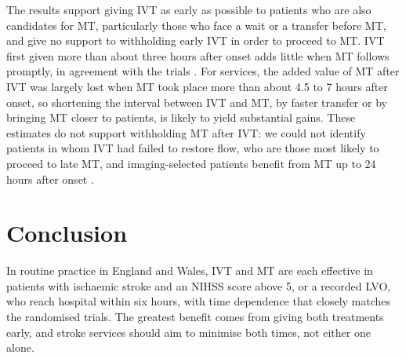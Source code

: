 The results support giving IVT as early as possible to patients who are also candidates for MT, particularly those who face a wait or a transfer before MT, and give no support to withholding early IVT in order to proceed to MT. IVT first given more than about three hours after onset adds little when MT follows promptly, in agreement with the trials \cite{kaesmacher2024,tnkplus2026}. For services, the added value of MT after IVT was largely lost when MT took place more than about 4.5 to 7 hours after onset, so shortening the interval between IVT and MT, by faster transfer or by bringing MT closer to patients, is likely to yield substantial gains. These estimates do not support withholding MT after IVT: we could not identify patients in whom IVT had failed to restore flow, who are those most likely to proceed to late MT, and imaging-selected patients benefit from MT up to 24 hours after onset \cite{nogueira2018,albers2018}.

\section{Conclusion}

In routine practice in England and Wales, IVT and MT are each effective in patients with ischaemic stroke and an NIHSS score above 5, or a recorded LVO, who reach hospital within six hours, with time dependence that closely matches the randomised trials. The greatest benefit comes from giving both treatments early, and stroke services should aim to minimise both times, not either one alone.